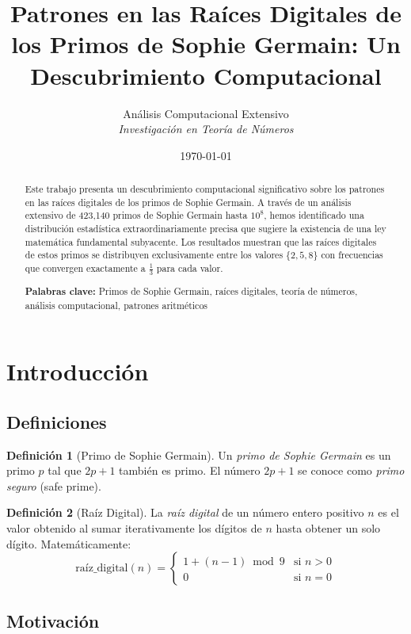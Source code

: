 \documentclass[11pt,a4paper]{article}
\title{\textbf{Patrones en las Raíces Digitales de los Primos de Sophie Germain: Un Descubrimiento Computacional}}
\author{
    Análisis Computacional Extensivo\\
    \textit{Investigación en Teoría de Números}
}
\date{\today}
\theoremstyle{definition}
\newtheorem{definition}{Definición}
\theoremstyle{remark}
\begin{document}
\maketitle

\begin{abstract}
Este trabajo presenta un descubrimiento computacional significativo sobre los patrones en las raíces digitales de los primos de Sophie Germain. A través de un análisis extensivo de 423,140 primos de Sophie Germain hasta $10^8$, hemos identificado una distribución estadística extraordinariamente precisa que sugiere la existencia de una ley matemática fundamental subyacente. Los resultados muestran que las raíces digitales de estos primos se distribuyen exclusivamente entre los valores $\{2, 5, 8\}$ con frecuencias que convergen exactamente a $\frac{1}{3}$ para cada valor.

\textbf{Palabras clave:} Primos de Sophie Germain, raíces digitales, teoría de números, análisis computacional, patrones aritméticos
\end{abstract}

\section{Introducción}

\subsection{Definiciones}

\begin{definition}[Primo de Sophie Germain]
Un \textit{primo de Sophie Germain} es un primo $p$ tal que $2p+1$ también es primo. El número $2p+1$ se conoce como \textit{primo seguro} (safe prime).
\end{definition}

\begin{definition}[Raíz Digital]
La \textit{raíz digital} de un número entero positivo $n$ es el valor obtenido al sumar iterativamente los dígitos de $n$ hasta obtener un solo dígito. Matemáticamente:
\begin{equation}
\text{raíz\_digital}(n) = \begin{cases}
1 + (n-1) \bmod 9 & \text{si } n > 0 \\
0 & \text{si } n = 0
\end{cases}
\end{equation}
\end{definition}

\subsection{Motivación}
\end{document}
